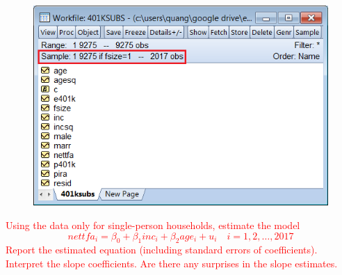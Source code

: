 \documentclass[12pt]{report}
\begin{document}
\begin{figure}[H]
	\centering
	\includegraphics{tute6_q3_3}
\end{figure}
\vspace{-\baselineskip}
\noindent \textcolor{red}{Using the data only for single-person households, estimate the model $$nettfa_i = \beta_0 +\beta_1inc_i + \beta_2age_i + u_i \quad i=1,2,\dots,2017$$ Report the estimated equation (including standard errors of coefficients). Interpret the slope coefficients. Are there any surprises in the slope estimates.}
\end{document}
